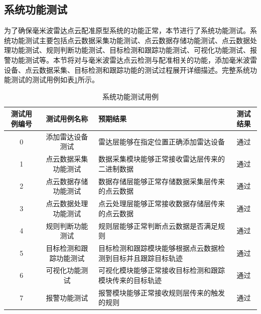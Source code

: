 \subsection{系统功能测试}
为了确保毫米波雷达点云配准原型系统的功能正常，本节进行了系统功能测试。系统功能测试主要包括点云数据采集功能测试、点云数据存储功能测试、点云数据处理功能测试、规则判断功能测试、目标检测和跟踪功能测试、可视化功能测试、报警功能测试等。本节将对与毫米波雷达点云检测与配准相关的功能，添加毫米波雷设备、点云数据采集、目标检测和跟踪功能的测试过程展开详细描述。完整系统功能测试的测试用例如表\ref{系统功能测试用例}所示。
\begin{table}
    \centering
    \tabcolsep=3mm
    \caption{系统功能测试用例}
    \begin{tabular}{ccp{3cm}c}
        \toprule
        测试用例编号 & 测试用例名称 & 预期结果 & 测试结果 \\
        \midrule
        0 & 添加雷达设备测试 & 雷达层能够在指定位置正确添加雷达设备& 通过 \\
        1 & 点云数据采集功能测试 & 数据采集模块能够正常接收雷达层传来的二进制数据 & 通过 \\
        2 & 点云数据存储功能测试 & 数据存储层能够正常存储数据采集层传来的点云数据 & 通过 \\
        3 & 点云数据处理功能测试 & 点云处理层能够正常接收数据存储层传来的点云数据 & 通过 \\
        4 & 规则判断功能测试 & 规则层能够正常判断点云数据是否满足规则 & 通过 \\
        5 & 目标检测和跟踪功能测试 & 目标检测和跟踪模块能够根据点云数据检测到目标并且跟踪目标轨迹 & 通过 \\
        6 & 可视化功能测试 & 可视化模块能够正常接收目标检测和跟踪模块传来的目标轨迹 & 通过 \\
        7 & 报警功能测试 & 报警模块能够正常接收规则层传来的触发的规则 & 通过 \\

        \bottomrule
    \end{tabular}
    \label{系统功能测试用例}
\end{table}


